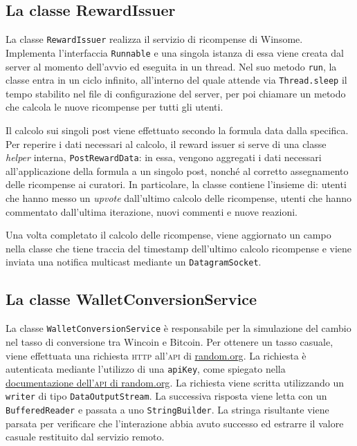 \documentclass[a4paper,8pt]{article} %
\def\code#1{\texttt{#1}}
\begin{document}
\subsection{La classe RewardIssuer}
La classe \code{RewardIssuer} realizza il servizio di ricompense di Winsome. Implementa l'interfaccia \code{Runnable} e una singola istanza di essa viene creata dal server al momento dell'avvio ed eseguita in un thread.
Nel suo metodo \code{run}, la classe entra in un ciclo infinito, all'interno del quale attende via \code{Thread.sleep} il tempo stabilito nel file di configurazione del server, per poi chiamare un metodo che calcola
le nuove ricompense per tutti gli utenti.
\par Il calcolo sui singoli post viene effettuato secondo la formula data dalla specifica. Per reperire i dati necessari al calcolo, il reward issuer si serve di una classe \emph{helper} interna, \code{PostRewardData}: in essa,
vengono aggregati i dati necessari all'applicazione della formula a un singolo post, nonché al corretto assegnamento delle ricompense ai curatori. In particolare, la classe contiene l'insieme di: utenti che hanno messo un \emph{upvote}
dall'ultimo calcolo delle ricompense, utenti che hanno commentato dall'ultima iterazione, nuovi commenti e nuove reazioni.
\par Una volta completato il calcolo delle ricompense, viene aggiornato un campo nella classe che tiene traccia del timestamp dell'ultimo calcolo ricompense e viene inviata una notifica multicast mediante un \code{DatagramSocket}.

\subsection{La classe WalletConversionService}
La classe \code{WalletConversionService} è responsabile per la simulazione del cambio nel tasso di conversione tra Wincoin e Bitcoin.
Per ottenere un tasso casuale, viene effettuata una richiesta \textsc{http} all'\textsc{api} di \href{https://random.org}{random.org}. La richiesta è autenticata mediante l'utilizzo di una \code{apiKey}, come spiegato nella
\href{https://api.random.org/json-rpc/4/basic}{documentazione dell'\textsc{api} di random.org}. La richiesta viene scritta utilizzando un \code{writer} di tipo \code{DataOutputStream}. La successiva risposta viene letta
con un \code{BufferedReader} e passata a uno \code{StringBuilder}. La stringa risultante viene parsata per verificare che l'interazione abbia avuto successo ed estrarre il valore casuale restituito dal servizio remoto.
\end{document}
